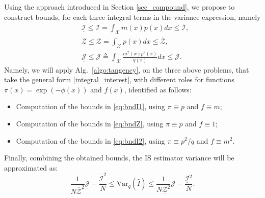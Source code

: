 \documentclass[review]{elsarticle}
\newcommand{\normalized}{\tilde}
\newcommand{\Ic}{\mathcal{I}}
\newcommand{\Zc}{\mathcal{Z}}
\newcommand{\Var}{\mathrm{Var}}
\def\x{{\bf x}}
\newcommand{\emilie}[1]{\textcolor{magenta}{\textbf{[{\em EMILIE SAYS}: #1]}}}
\newcommand{\victor}[1]{\textcolor{blue}{\textbf{[{\em VICTOR SAYS}: #1]}}}
\begin{document}
Using the approach introduced in Section \ref{sec_compound}, we propose to construct bounds, for each three integral terms in the variance expression, namely
\begin{align}
&\underline{\Ic} \leq {\Ic} = \int_{\mathcal{X}} {m(x)} p(x) dx \leq \overline{\Ic} \label{eq:bndI1},\\
&\underline{\Zc} \leq {\Zc} = \int_{\mathcal{X}}  p(x) dx \leq \overline{\Zc}\label{eq:bndZ},\\
&\underline{\mathcal{J}} \leq {\mathcal{J}} \triangleq \int_{\mathcal{X}} \frac{m^2(x)  p^2(x) }{q(x)} dx \leq \overline{\mathcal{J}}\label{eq:bndI2}.
\end{align}
Namely, we will apply Alg.~\ref{algo:tangency}, on the three above problems, that take the general form \eqref{integral_interest}, with different roles for functions $\pi(x) = \exp(-\phi(x))$ and $f(x)$, identified as follows:
\begin{itemize}
    \item Computation of the bounds in \eqref{eq:bndI1}, using $\pi \equiv p$ and $f \equiv m$;
     \item Computation of the bounds in \eqref{eq:bndZ}, using $\pi \equiv p$ and $f \equiv 1$;
        \item Computation of the bounds in \eqref{eq:bndI2}, using $\pi \equiv p^2/q$ and $f \equiv m^2$.
\end{itemize}
Finally, combining the obtained bounds, the IS estimator variance will be approximated as:
\begin{equation}
\frac{1}{N\overline{\Zc}^2}  \underline{\mathcal{J}} - \frac{\overline{\Ic}^2}{N} \leq \Var_q\left(\widehat I\right) \leq \frac{1}{N\underline{\Zc}^2}  \overline{\mathcal{J}} - \frac{\underline{\Ic}^2}{N}.
\end{equation}
\end{document}
